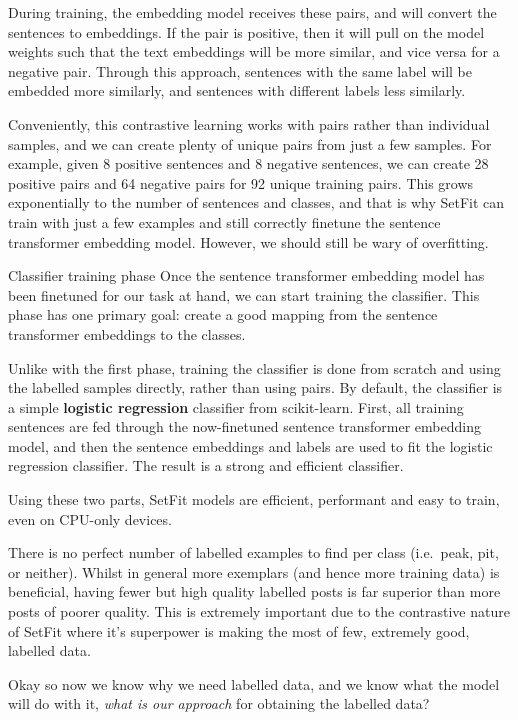 \documentclass[
  letterpaper,
  DIV=11,
  numbers=noendperiod]{scrreprt}
\begin{document}
\begin{tcolorbox}
During training, the embedding model receives these pairs, and will
convert the sentences to embeddings. If the pair is positive, then it
will pull on the model weights such that the text embeddings will be
more similar, and vice versa for a negative pair. Through this approach,
sentences with the same label will be embedded more similarly, and
sentences with different labels less similarly.

Conveniently, this contrastive learning works with pairs rather than
individual samples, and we can create plenty of unique pairs from just a
few samples. For example, given 8 positive sentences and 8 negative
sentences, we can create 28 positive pairs and 64 negative pairs for 92
unique training pairs. This grows exponentially to the number of
sentences and classes, and that is why SetFit can train with just a few
examples and still correctly finetune the sentence transformer embedding
model. However, we should still be wary of overfitting.

Classifier training phase Once the sentence transformer embedding model
has been finetuned for our task at hand, we can start training the
classifier. This phase has one primary goal: create a good mapping from
the sentence transformer embeddings to the classes.

Unlike with the first phase, training the classifier is done from
scratch and using the labelled samples directly, rather than using
pairs. By default, the classifier is a simple \textbf{logistic
regression} classifier from scikit-learn. First, all training sentences
are fed through the now-finetuned sentence transformer embedding model,
and then the sentence embeddings and labels are used to fit the logistic
regression classifier. The result is a strong and efficient classifier.

Using these two parts, SetFit models are efficient, performant and easy
to train, even on CPU-only devices.

\end{tcolorbox}

There is no perfect number of labelled examples to find per class
(i.e.~peak, pit, or neither). Whilst in general more exemplars (and
hence more training data) is beneficial, having fewer but high quality
labelled posts is far superior than more posts of poorer quality. This
is extremely important due to the contrastive nature of SetFit where
it's superpower is making the most of few, extremely good, labelled
data.

Okay so now we know why we need labelled data, and we know what the
model will do with it, \emph{what is our approach} for obtaining the
labelled data?
\end{document}
